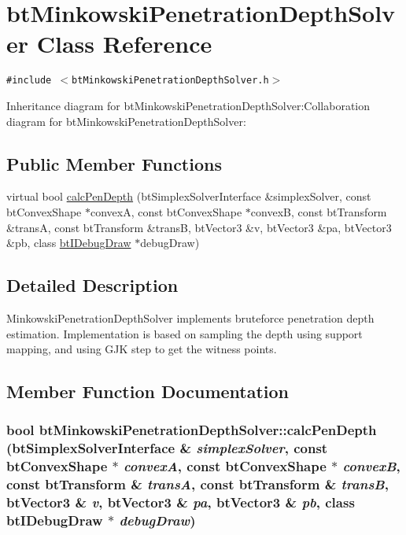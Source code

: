 \hypertarget{classbt_minkowski_penetration_depth_solver}{
\section{btMinkowskiPenetrationDepthSolver Class Reference}
\label{classbt_minkowski_penetration_depth_solver}
}
{\tt \#include $<$btMinkowskiPenetrationDepthSolver.h$>$}

Inheritance diagram for btMinkowskiPenetrationDepthSolver:Collaboration diagram for btMinkowskiPenetrationDepthSolver:\subsection*{Public Member Functions}
\begin{CompactItemize}
\item 
virtual bool \hyperlink{classbt_minkowski_penetration_depth_solver_da75e93337af3d895f0f33f3140361c7}{calcPenDepth} (btSimplexSolverInterface \&simplexSolver, const btConvexShape $\ast$convexA, const btConvexShape $\ast$convexB, const btTransform \&transA, const btTransform \&transB, btVector3 \&v, btVector3 \&pa, btVector3 \&pb, class \hyperlink{classbt_i_debug_draw}{btIDebugDraw} $\ast$debugDraw)
\end{CompactItemize}


\subsection{Detailed Description}
MinkowskiPenetrationDepthSolver implements bruteforce penetration depth estimation. Implementation is based on sampling the depth using support mapping, and using GJK step to get the witness points. 

\subsection{Member Function Documentation}
\hypertarget{classbt_minkowski_penetration_depth_solver_da75e93337af3d895f0f33f3140361c7}{
\subsubsection[calcPenDepth]{\setlength{\rightskip}{0pt plus 5cm}bool btMinkowskiPenetrationDepthSolver::calcPenDepth (btSimplexSolverInterface \& {\em simplexSolver}, \/  const btConvexShape $\ast$ {\em convexA}, \/  const btConvexShape $\ast$ {\em convexB}, \/  const btTransform \& {\em transA}, \/  const btTransform \& {\em transB}, \/  btVector3 \& {\em v}, \/  btVector3 \& {\em pa}, \/  btVector3 \& {\em pb}, \/  class {\bf btIDebugDraw} $\ast$ {\em debugDraw})}}
\label{classbt_minkowski_penetration_depth_solver_da75e93337af3d895f0f33f3140361c7}




